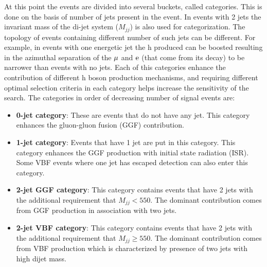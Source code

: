 At this point the events are divided into several buckets, called categories. This is done on the basis of number of jets present in the event. In events with 2 jets the invariant mass of the di-jet system ($M_{jj}$) is also used for categorization. The topology of events containing different number of such jets can be different. For example, in events with one energetic jet the h produced can be boosted resulting in the azimuthal separation of the $\mu$ and $\text{e}$ (that come from its decay) to be narrower than events with no jets. Each of this categories enhance the contribution of different h boson production mechanisms, and requiring different optimal selection criteria in each category  helps increase the sensitivity of the search. The categories in order of decreasing number of signal events are:
\begin{itemize}
\item \textbf{0-jet category}: These are events that do not have any jet. This category enhances the gluon-gluon fusion (GGF) contribution.
\item \textbf{1-jet category}: Events that have 1 jet are put in this category. This category enhances the GGF production with initial state radiation (ISR). Some VBF events where one jet has escaped detection can also enter this category.
\item \textbf {2-jet GGF category}: This category contains events that have 2 jets with the additional requirement that $M_{jj}<550$\GeV. The dominant contribution comes from GGF production in association with two jets.
\item \textbf{2-jet VBF category}: This category contains events that have 2 jets with the additional requirement that $M_{jj}\geq 550$\GeV. The dominant contribution comes from VBF production which is characterized by presence of two jets with high dijet mass.  
\end{itemize}


